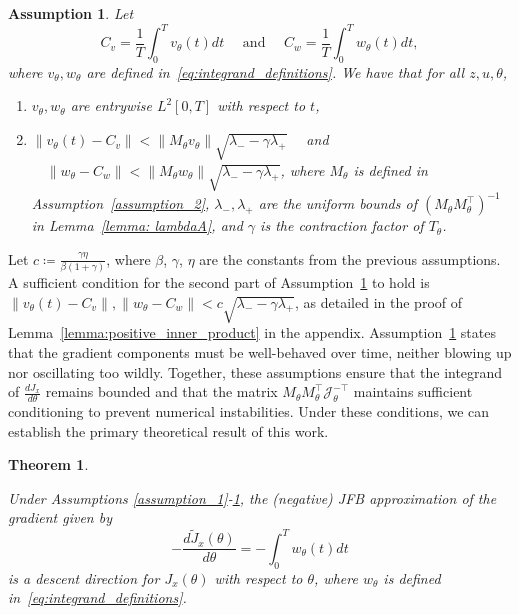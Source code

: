 \documentclass[letterpaper, 10 pt, conference]{ieeeconf}  %
\newtheorem{theorem}{Theorem}
\newtheorem{assumption}{Assumption}
\begin{document}
    \begin{assumption} Let 
    \begin{equation*}
        C_v = \frac{1}{T} \int_0^T v_\theta(t) dt \quad \text{ and } \quad C_w = \frac{1}{T} \int_0^T w_\theta(t) dt, 
    \end{equation*}
    where $v_\theta, w_\theta$ are defined in~\eqref{eq:integrand_definitions}. We have that for all $z,u,\theta$,
    \begin{enumerate}
        \item $v_\theta, w_\theta$ are entrywise $L^2[0,T]$ with respect to $t$,
        \item $\|v_\theta(t) - C_v\|< \|M_{\theta}v_{\theta}\|\sqrt{\lambda_{-} - \gamma\lambda_{+}} \quad $ and $ \quad \|w_\theta - C_w\| < \|M_{\theta}w_{\theta}\|\sqrt{\lambda_{-} - \gamma\lambda_{+}}$, where $M_\theta$ is defined in Assumption~\ref{assumption_2}, 
$\lambda_-, \lambda_+$ are the uniform bounds of $\left( M_\theta M_\theta^\top \right)^{-1}$ in Lemma~\ref{lemma: lambdaA},
        and $\gamma$ is the contraction factor of $T_\theta$.
    \end{enumerate}
    \label{assumption_timeaverage}
    \end{assumption}
Let $c\coloneqq \frac{ \gamma \eta}{\beta(1+\gamma)}$, where $\beta$, $\gamma$, $\eta$ are the constants from the previous assumptions. A sufficient condition for the second part of Assumption~\ref{assumption_timeaverage} to hold is $\|v_\theta(t) - C_v\|, \|w_\theta - C_w\| < c \sqrt{\lambda_{-} - \gamma\lambda_{+}}$, as detailed in the proof of Lemma~\ref{lemma:positive_inner_product} in the appendix.
    Assumption~\ref{assumption_timeaverage} states that the gradient components must be well-behaved over time, neither blowing up nor oscillating too wildly. 
    Together, these assumptions ensure that the integrand of $\frac{dJ_x}{d\theta}$ remains bounded and that the matrix $M_\theta M_\theta^\top \mathcal{J}_\theta^{-\top}$ maintains sufficient conditioning to prevent numerical instabilities. Under these conditions, we can establish the primary theoretical result of this work. 
    \newcommand{\mainTheorem}[1]{
    Under Assumptions \ref{assumption_1}-\ref{assumption_timeaverage}, the (negative) JFB approximation of the gradient given by 
    \begin{equation*}
        -\frac{d\tilde{J}_x(\theta)}{d\theta} = -\int_0^T w_\theta(t) dt
    \end{equation*} 
    is a descent direction for $J_x(\theta)$ with respect to $\theta$, where $w_\theta$ is defined in~\eqref{eq:integrand_definitions}.
    }
    \begin{theorem}
    \label{theorem:main_theorem}
    \mainTheorem{main}
    \end{theorem}
\end{document}
